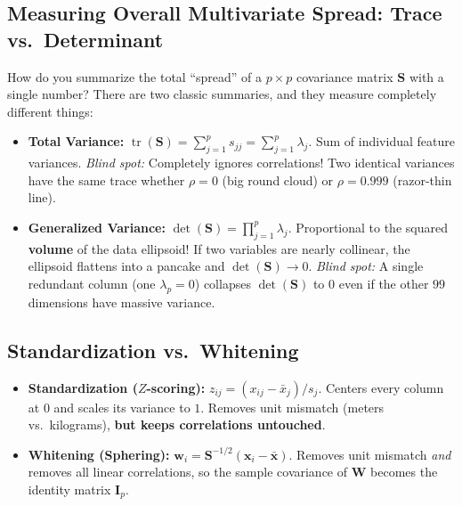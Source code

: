 \documentclass[11pt, a4paper]{article}
\begin{document}
\subsection{Measuring Overall Multivariate Spread: Trace vs.\ Determinant}
How do you summarize the total ``spread'' of a $p \times p$ covariance matrix $\mathbf{S}$ with a single number? There are two classic summaries, and they measure completely different things:
\begin{itemize}
    \item \textbf{Total Variance:} $\operatorname{tr}(\mathbf{S}) = \sum_{j=1}^p s_{jj} = \sum_{j=1}^p \lambda_j$. Sum of individual feature variances. \emph{Blind spot:} Completely ignores correlations! Two identical variances have the same trace whether $\rho = 0$ (big round cloud) or $\rho = 0.999$ (razor-thin line).
    \item \textbf{Generalized Variance:} $\det(\mathbf{S}) = \prod_{j=1}^p \lambda_j$. Proportional to the squared \textbf{volume} of the data ellipsoid! If two variables are nearly collinear, the ellipsoid flattens into a pancake and $\det(\mathbf{S}) \to 0$. \emph{Blind spot:} A single redundant column (one $\lambda_p = 0$) collapses $\det(\mathbf{S})$ to $0$ even if the other $99$ dimensions have massive variance.
\end{itemize}

\subsection{Standardization vs.\ Whitening}
\begin{itemize}
    \item \textbf{Standardization ($Z$-scoring):} $z_{ij} = (x_{ij} - \bar{x}_j)/s_j$. Centers every column at $0$ and scales its variance to $1$. Removes unit mismatch (meters vs.\ kilograms), \textbf{but keeps correlations untouched}.
    \item \textbf{Whitening (Sphering):} $\mathbf{w}_i = \mathbf{S}^{-1/2}(\mathbf{x}_i - \bar{\mathbf{x}})$. Removes unit mismatch \emph{and} removes all linear correlations, so the sample covariance of $\mathbf{W}$ becomes the identity matrix $\mathbf{I}_p$.
\end{itemize}
\end{document}
